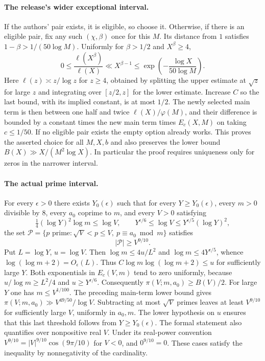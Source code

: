 \paragraph{The release's wider exceptional interval.}
If the authors' pair exists, it is eligible, so choose it. Otherwise,
if there is an eligible pair, fix any such \((\chi,\beta)\) once for
this \(M\). Its distance from \(1\) satisfies
\(1-\beta>1/(50\log M)\). Uniformly for \(\beta>1/2\) and
\(X^\beta\ge4\),
\[
 0\le\frac{\ell(X^\beta)}{\ell(X)}
     \ll X^{\beta-1}
     \le \exp\!\left(-\frac{\log X}{50\log M}\right).
\]
Here \(\ell(z)\asymp z/\log z\) for \(z\ge4\), obtained by splitting
the upper estimate at \(\sqrt z\) for large \(z\) and integrating
over \([z/2,z]\) for the lower estimate. Increase \(C\) so the last
bound, with its implied constant, is at most \(1/2\).
The newly selected main term is then between one half and twice
\(\ell(X)/\varphi(M)\), and their difference is bounded by a constant
times the new main term times \(E_c(X,M)\) on taking \(c\le1/50\).
If no eligible pair exists the empty option already works.
This proves the asserted choice for all \(M,X,b\) and also preserves
the lower bound \(B(X)\gg X/(M^2\log X)\). In particular the proof
requires uniqueness only for zeros in the narrower interval.

\paragraph{The actual prime interval.}
For every \(\epsilon>0\) there exists \(Y_0(\epsilon)\) such that
for every \(Y\ge Y_0(\epsilon)\), every \(m>0\) divisible by \(8\),
every \(a_0\) coprime to \(m\), and every \(V>0\) satisfying
\[
  \tfrac14(\log Y)^2\log m\le\log V,\qquad
  Y^{\epsilon/6}\le \log V\le Y^{\epsilon/5}(\log Y)^2,
\]
the set \(\mathcal P=\{p\text{ prime}:\sqrt V<p\le V,\
p\equiv a_0\bmod m\}\) satisfies
\begin{equation}
                       |\mathcal P|\ge V^{9/10}.
 \label{eq:window-ap-lower-count}
\end{equation}
Put \(L=\log Y\), \(u=\log V\).
Then \(\log m\le4u/L^2\) and \(\log m\le4Y^{\epsilon/5}\), whence
\(\log(\log m+2)=O_\epsilon(L)\).
Thus \(C\log m\log(\log m+2)\le u\) for sufficiently large \(Y\).
Both exponentials in \(E_c(V,m)\) tend to zero uniformly, because
\(u/\log m\ge L^2/4\) and \(u\ge Y^{\epsilon/6}\).
Consequently \(\pi(V;m,a_0)\ge B(V)/2\). For large \(Y\) one has
\(m\le V^{1/100}\). The preceding main-term lower bound gives
\(\pi(V;m,a_0)\gg V^{49/50}/\log V\). Subtracting at most
\(\sqrt V\) primes leaves at least \(V^{9/10}\) for sufficiently
large \(V\), uniformly in \(a_0,m\). The lower hypothesis on \(u\)
ensures that this last threshold follows from \(Y\ge Y_0(\epsilon)\).
The formal statement also quantifies over nonpositive real \(V\).
Under its real-power convention \(V^{9/10}=|V|^{9/10}\cos(9\pi/10)\)
for \(V<0\), and \(0^{9/10}=0\). These cases satisfy the inequality
by nonnegativity of the cardinality.

